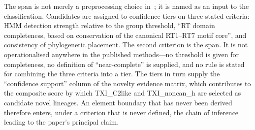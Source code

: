 
The span is not merely a preprocessing choice in~\cite{toro2026}; it is named
as an input to the classification. Candidates are assigned to confidence tiers
on three stated criteria: HMM detection strength relative to the group
threshold, ``RT domain completeness, based on conservation of the canonical
RT1--RT7 motif core'', and consistency of phylogenetic placement. The second
criterion is the span. It is not operationalised anywhere in the published
methods---no threshold is given for completeness, no definition of
``near-complete'' is supplied, and no rule is stated for combining the three
criteria into a tier. The tiers in turn supply the ``confidence support''
column of the novelty evidence matrix, which contributes to the composite
score by which TXI\_C2like and TXI\_noncan\_h are selected as candidate novel
lineages. An element boundary that has never been derived therefore enters,
under a criterion that is never defined, the chain of inference leading to the
paper's principal claim.

